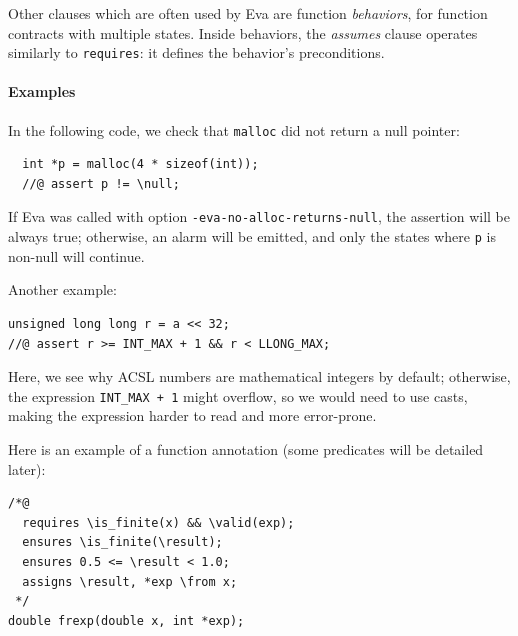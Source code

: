 \documentclass[web]{frama-c-book}
\newcommand{\Eva}{\textsf{Eva}}
\begin{document}
Other clauses which are often used by \Eva{} are function {\em behaviors}, for
function contracts with multiple states. Inside behaviors, the {\em assumes}
clause operates similarly to \texttt{requires}: it defines the behavior's
preconditions.

\paragraph{Examples}

In the following code, we check that \texttt{malloc} did not return a null
pointer:

\begin{lstlisting}
  int *p = malloc(4 * sizeof(int));
  //@ assert p != \null;
\end{lstlisting}

If \Eva{} was called with option \texttt{-eva-no-alloc-returns-null},
the assertion will be always true; otherwise, an alarm will be emitted,
and only the states where \texttt{p} is non-null will continue.

Another example:

\begin{lstlisting}
unsigned long long r = a << 32;
//@ assert r >= INT_MAX + 1 && r < LLONG_MAX;
\end{lstlisting}

Here, we see why ACSL numbers are mathematical integers by default; otherwise,
the expression \texttt{INT\_MAX + 1} might overflow, so we would need to use
casts, making the expression harder to read and more error-prone.

Here is an example of a function annotation (some predicates will be detailed
later):

\begin{lstlisting}
/*@
  requires \is_finite(x) && \valid(exp);
  ensures \is_finite(\result);
  ensures 0.5 <= \result < 1.0;
  assigns \result, *exp \from x;
 */
double frexp(double x, int *exp);
\end{lstlisting}
\end{document}
